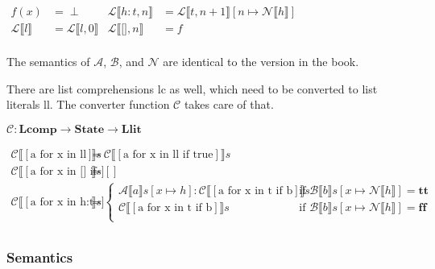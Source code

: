 \documentclass[12pt]{article}
\newcommand{\metavar}[1]{\textlangle#1\textrangle}
\newcommand{\dblbr}[1]{\llbracket#1\rrbracket}
\newcommand{\fancybr}[2]{#1 \dblbr{#2}}
\renewcommand{\AA}{\mathcal{A}}
\newcommand{\BB}{\mathcal{B}}
\newcommand{\CC}{\mathcal{C}}
\newcommand{\LL}{\mathcal{L}}
\newcommand{\NN}{\mathcal{N}}
\newcommand{\State}{\mathbf{State}}
\newcommand{\Llit}{\mathbf{Llit}}
\newcommand{\Lcomp}{\mathbf{Lcomp}}
\begin{document}
$\begin{aligned}
    f(x) &= \perp & \fancybr{\LL}{h:t, n} &= \fancybr{\LL}{t, n + 1}[n \mapsto \fancybr{\NN}{h}]\\
    \fancybr{\LL}{l} &= \fancybr{\LL}{l, 0} & \fancybr{\LL}{\texttt{[]}, n} &= f\\
\end{aligned}$

The semantics of $\AA$, $\BB$, and $\NN$ are identical to the version in the book.

There are list comprehensions \metavar{lc} as well, which need to be converted to list literals \metavar{ll}. The converter function $\CC$ takes care of that.

$\CC: \Lcomp \rightarrow \State \rightarrow \Llit$

$\begin{aligned}
    \fancybr{\CC}{[\text{a for x in ll}]} s &= \fancybr{\CC}{[\text{a for x in ll if true}]} s\\
    \fancybr{\CC}{[\text{a for x in [] if b}]} s &= []\\
    \fancybr{\CC}{[\text{a for x in h:t if b}]} s &= \begin{cases}
        \fancybr{\AA}{a} s[x \mapsto h] : \fancybr{\CC}{[\text{a for x in t if b}]} s
        & \text{if } \fancybr{\BB}{b} s[x \mapsto \fancybr{\NN}{h}] = \mathbf{tt}\\
        \fancybr{\CC}{[\text{a for x in t if b}]} s
        & \text{if } \fancybr{\BB}{b} s[x \mapsto \fancybr{\NN}{h}] = \mathbf{ff}\\
    \end{cases}\\
\end{aligned}$

\subsubsection{Semantics}
\end{document}
